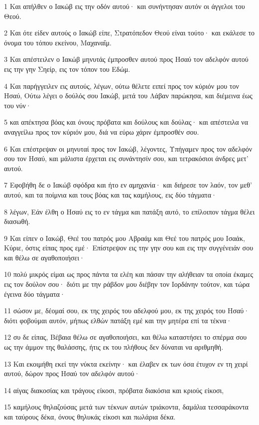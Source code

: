 \par 1 Και απήλθεν ο Ιακώβ εις την οδόν αυτού· και συνήντησαν αυτόν οι άγγελοι του Θεού.
\par 2 Και ότε είδεν αυτούς ο Ιακώβ είπε, Στρατόπεδον Θεού είναι τούτο· και εκάλεσε το όνομα του τόπου εκείνου, Μαχαναΐμ.
\par 3 Και απέστειλεν ο Ιακώβ μηνυτάς έμπροσθεν αυτού προς Ησαύ τον αδελφόν αυτού εις την γην Σηείρ, εις τον τόπον του Εδώμ.
\par 4 Και παρήγγειλεν εις αυτούς, λέγων, ούτω θέλετε ειπεί προς τον κύριόν μου τον Ησαύ, Ούτω λέγει ο δούλός σου Ιακώβ, μετά του Λάβαν παρώκησα, και διέμεινα έως του νύν·
\par 5 και απέκτησα βόας και όνους πρόβατα και δούλους και δούλας· και απέστειλα να αναγγείλω προς τον κύριόν μου, διά να εύρω χάριν έμπροσθέν σου.
\par 6 Και επέστρεψαν οι μηνυταί προς τον Ιακώβ, λέγοντες, Υπήγαμεν προς τον αδελφόν σου τον Ησαύ, και μάλιστα έρχεται εις συνάντησίν σου, και τετρακόσιοι άνδρες μετ' αυτού.
\par 7 Εφοβήθη δε ο Ιακώβ σφόδρα και ήτο εν αμηχανία· και διήρεσε τον λαόν, τον μεθ' αυτού, και τα ποίμνια και τους βόας και τας καμήλους, εις δύο τάγματα·
\par 8 λέγων, Εάν έλθη ο Ησαύ εις το εν τάγμα και πατάξη αυτό, το επίλοιπον τάγμα θέλει διασωθή.
\par 9 Και είπεν ο Ιακώβ, Θεέ του πατρός μου Αβραάμ και Θεέ του πατρός μου Ισαάκ, Κύριε, όστις είπας προς εμέ· Επίστρεψον εις την γην σου και εις την συγγένειάν σου και θέλω σε αγαθοποιήσει·
\par 10 πολύ μικρός είμαι ως προς πάντα τα ελέη και πάσαν την αλήθειαν τα οποία έκαμες εις τον δούλον σου· διότι με την ράβδον μου διέβην τον Ιορδάνην τούτον, και τώρα έγεινα δύο τάγματα·
\par 11 σώσον με, δέομαί σου, εκ της χειρός του αδελφού μου, εκ της χειρός του Ησαύ· διότι φοβούμαι αυτόν, μήπως ελθών πατάξη εμέ και την μητέρα επί τα τέκνα·
\par 12 συ δε είπας, Βέβαια θέλω σε αγαθοποιήσει, και θέλω καταστήσει το σπέρμα σου ως την άμμον της θαλάσσης, ήτις εκ του πλήθους δεν δύναται να αριθμηθή.
\par 13 Και εκοιμήθη εκεί την νύκτα εκείνην· και έλαβεν εκ των όσα έτυχον εν τη χειρί αυτού, δώρον προς Ησαύ τον αδελφόν αυτού·
\par 14 αίγας διακοσίας και τράγους είκοσι, πρόβατα διακόσια και κριούς είκοσι,
\par 15 καμήλους θηλαζούσας μετά των τέκνων αυτών τριάκοντα, δαμάλια τεσσαράκοντα και ταύρους δέκα, όνους θηλυκάς είκοσι και πωλάρια δέκα.
